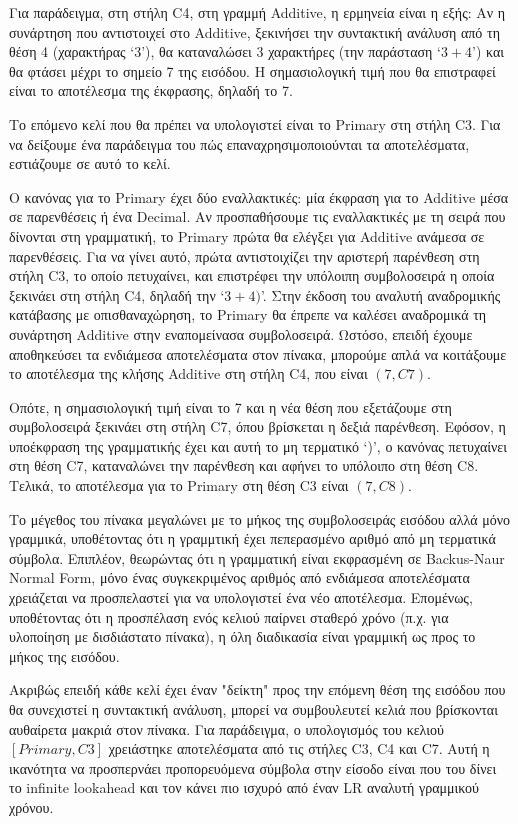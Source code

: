 \newpage

Για παράδειγμα, στη στήλη C4, στη γραμμή Additive, η ερμηνεία είναι η εξής: 
Αν η συνάρτηση που αντιστοιχεί στο Additive, ξεκινήσει την συντακτική ανάλυση από τη θέση 4 (χαρακτήρας `3'), θα καταναλώσει 3 χαρακτήρες (την παράσταση `$3+4$') και θα φτάσει μέχρι το σημείο 7 της εισόδου. 
Η σημασιολογική τιμή που θα επιστραφεί είναι το αποτέλεσμα της έκφρασης, δηλαδή το 7.

Το επόμενο κελί που θα πρέπει να υπολογιστεί είναι το Primary στη στήλη C3.
Για να δείξουμε ένα παράδειγμα του πώς επαναχρησιμοποιούνται τα αποτελέσματα, εστιάζουμε σε αυτό το κελί.

Ο κανόνας για το Primary έχει δύο εναλλακτικές: 
μία έκφραση για το Additive μέσα σε παρενθέσεις ή ένα Decimal.
Αν προσπαθήσουμε τις εναλλακτικές με τη σειρά που δίνονται στη γραμματική, το Primary πρώτα θα ελέγξει για Additive ανάμεσα σε παρενθέσεις.
Για να γίνει αυτό, πρώτα αντιστοιχίζει την αριστερή παρένθεση στη στήλη C3, το οποίο πετυχαίνει, και επιστρέφει την υπόλοιπη συμβολοσειρά η οποία ξεκινάει στη στήλη C4, δηλαδή την `$3+4)$'.
Στην έκδοση του αναλυτή αναδρομικής κατάβασης με οπισθαναχώρηση, το Primary θα έπρεπε να καλέσει αναδρομικά τη συνάρτηση Additive στην εναπομείνασα συμβολοσειρά. 
Ωστόσο, επειδή έχουμε αποθηκεύσει τα ενδιάμεσα αποτελέσματα στον πίνακα, μπορούμε απλά να κοιτάξουμε το αποτέλεσμα της κλήσης Additive στη στήλη C4, που είναι $(7,C7)$. 

Οπότε, η σημασιολογική τιμή είναι το 7 και η νέα θέση που εξετάζουμε στη συμβολοσειρά ξεκινάει στη στήλη C7, όπου βρίσκεται η δεξιά παρένθεση.
Εφόσον, η υποέκφραση της γραμματικής έχει και αυτή το μη τερματικό `)', ο κανόνας πετυχαίνει στη θέση C7, καταναλώνει την παρένθεση και αφήνει το υπόλοιπο στη θέση C8.
Τελικά, το αποτέλεσμα για το Primary στη θέση C3 είναι $(7, C8)$.

Το μέγεθος του πίνακα μεγαλώνει με το μήκος της συμβολοσειράς εισόδου αλλά μόνο γραμμικά, υποθέτοντας ότι η γραμμτική έχει πεπερασμένο αριθμό από μη τερματικά σύμβολα.
Επιπλέον, θεωρώντας ότι η γραμματική είναι εκφρασμένη σε Backus-Naur Normal Form, μόνο ένας συγκεκριμένος αριθμός από ενδιάμεσα αποτελέσματα χρειάζεται να προσπελαστεί για να υπολογιστεί ένα νέο αποτέλεσμα.
Επομένως, υποθέτοντας ότι η προσπέλαση ενός κελιού παίρνει σταθερό χρόνο (π.χ. για υλοποίηση με δισδιάστατο πίνακα), η όλη διαδικασία είναι γραμμική ως προς το μήκος της εισόδου.

Ακριβώς επειδή κάθε κελί έχει έναν "δείκτη" προς την επόμενη θέση της εισόδου που θα συνεχιστεί η συντακτική ανάλυση, μπορεί να συμβουλευτεί κελιά που βρίσκονται αυθαίρετα μακριά στον πίνακα.
Για παράδειγμα, ο υπολογισμός του κελιού $[Primary, C3]$ χρειάστηκε αποτελέσματα από τις στήλες C3, C4 και C7. 
Αυτή η ικανότητα να προσπερνάει προπορευόμενα σύμβολα στην είσοδο είναι που του δίνει το infinite lookahead και τον κάνει πιο ισχυρό από έναν LR αναλυτή γραμμικού χρόνου.

